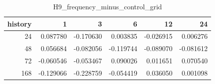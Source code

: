 \begin{table}
\caption{H9_frequency_minus_control_grid}
\label{tab:H9_frequency_minus_control_grid}
\begin{tabular}{rrrrrr}
\toprule
history & 1 & 3 & 6 & 12 & 24 \\
\midrule
24 & 0.087780 & -0.170630 & 0.003835 & -0.026915 & 0.006276 \\
48 & 0.056684 & -0.082056 & -0.119744 & -0.089070 & -0.081612 \\
72 & -0.060546 & -0.053467 & 0.090026 & 0.011651 & 0.070540 \\
168 & -0.129066 & -0.228759 & -0.054419 & 0.036050 & 0.001098 \\
\bottomrule
\end{tabular}
\end{table}
